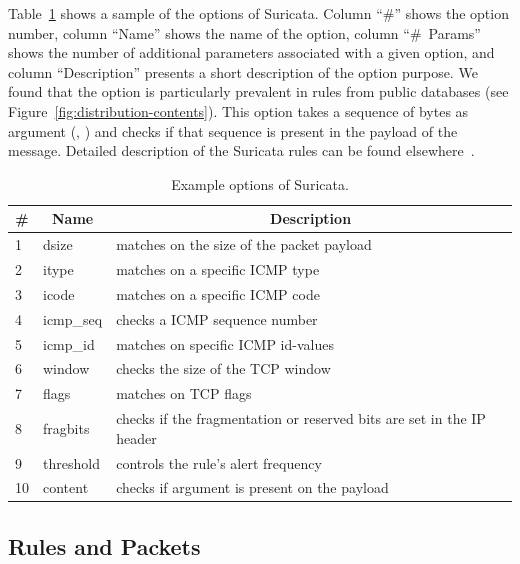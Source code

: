 \documentclass[runningheads]{llncs}
\begin{document}
Table~\ref{table:rules} shows a sample of the options of
Suricata. Column ``\#'' shows the option number, column ``Name'' shows
the name of the option, column ``\#~Params'' shows the number of
additional parameters associated with a given option, and column
``Description'' presents a short description of the option purpose. We
found that the option  is particularly prevalent in
rules from public databases (see
Figure~\ref{fig:distribution-contents}). This option takes a sequence
of bytes as argument (\eg{}, ) and checks
if that sequence is present in the payload of the message. Detailed
description of the Suricata rules can be found
elsewhere~\cite{suri-rule-format}.

\begin{table}[h]
  \caption{\label{table:rules}Example options of Suricata.}  
  \centering
  \begin{tabular}{p{0.35cm}ll}
    \toprule
    \multicolumn{1}{c}{\#} & \multicolumn{1}{c}{Name} &  \multicolumn{1}{c}{Description}\\
    \midrule     
    1 & dsize & matches on the size of the packet payload\\
    2 & itype &  matches on a specific ICMP type\\
    3 & icode & matches on a specific ICMP code\\
    4 & icmp\_seq  & checks a ICMP sequence number\\
    5 & icmp\_id & matches on specific ICMP id-values\\
    6 & window & checks the size of the TCP window\\
    7 & flags & matches on TCP flags\\
    8 & fragbits & checks if the fragmentation or reserved bits are set in the IP header\\
    9 & threshold & controls the rule’s alert frequency\\
    10 & content & checks if argument is present on the payload\\
    \bottomrule
  \end{tabular}
\end{table}

\subsection{Rules and Packets}
\label{sec:rules-and-packets}

\end{document}
